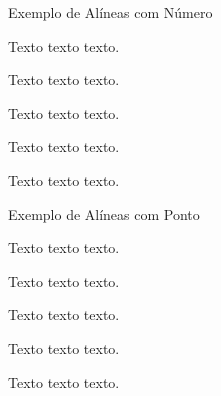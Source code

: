 \begin{center}
Exemplo de Alíneas com Número  
\end{center}
\begin{alineascomnumero}
\item Texto texto texto.
\item Texto texto texto.
\item Texto texto texto.
\item Texto texto texto.
\item Texto texto texto.
\end{alineascomnumero}

\begin{center}
Exemplo de Alíneas com Ponto  
\end{center}
\begin{alineascomponto}
\item Texto texto texto.
\item Texto texto texto.
\item Texto texto texto.
\begin{subalineascomponto}
\item Texto texto texto.
\item Texto texto texto.
\end{subalineascomponto}
\end{alineascomponto}